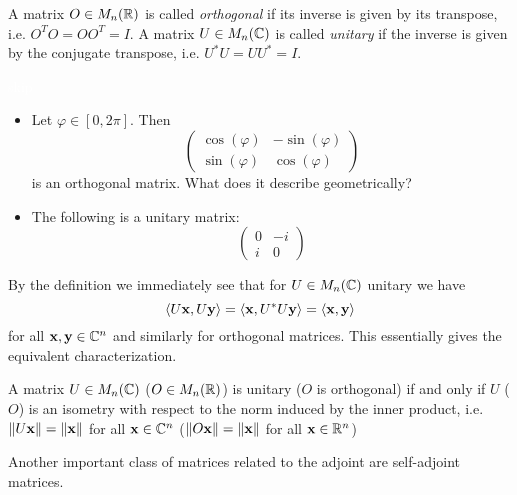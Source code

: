\documentclass{article}
\begin{document}
\begin{definition}
A matrix $O\in M_n({\mathbb{R}})$ is called \emph{orthogonal} if its inverse is given by its transpose, i.e. $O^T O = O O^T = I$. A matrix $U\in M_n({\mathbb{C}})$ is called \emph{unitary} if the inverse is given by the conjugate transpose, i.e. $U^* U = U U^* = I$.
\end{definition}

\begin{example}
\textcolor{white}{skip}
\begin{itemize}
    \item Let $\varphi \in [0,2\pi]$. Then 
    \begin{equation*}
        \begin{pmatrix}
            \cos(\varphi) & -\sin(\varphi) \\
            \sin(\varphi) & \cos(\varphi)
        \end{pmatrix}
    \end{equation*}
    is an orthogonal matrix. What does it describe geometrically?
    \item The following is a unitary matrix:
        \begin{equation*}
        \begin{pmatrix}
            0 & -i \\
            i & 0
        \end{pmatrix}
    \end{equation*}
\end{itemize}
\end{example}

By the definition we immediately see that for $U \in M_n({\mathbb{C}})$ unitary we have
\begin{equation*}
    \langle U{\mathbf{x}}, U{\mathbf{y}} \rangle = \langle {\mathbf{x}}, U^*U{\mathbf{y}} \rangle = \langle {\mathbf{x}},{\mathbf{y}} \rangle
\end{equation*}
for all ${\mathbf{x}},{\mathbf{y}} \in {\mathbb{C}}^n$ and similarly for orthogonal matrices. This essentially gives the equivalent characterization.

\begin{proposition}
A matrix $U\in M_n({\mathbb{C}})$ ($O\in M_n({\mathbb{R}})$) is unitary ($O$ is orthogonal) if and only if $U$ ($O$) is an isometry with respect to the norm induced by the inner product, i.e. $\Vert U{\mathbf{x}} \Vert = \Vert {\mathbf{x}} \Vert$ for all ${\mathbf{x}} \in {\mathbb{C}}^n$ ($\Vert O{\mathbf{x}} \Vert = \Vert {\mathbf{x}} \Vert$ for all ${\mathbf{x}} \in {\mathbb{R}}^n$)
\end{proposition}

Another important class of matrices related to the adjoint are self-adjoint matrices.
\end{document}
